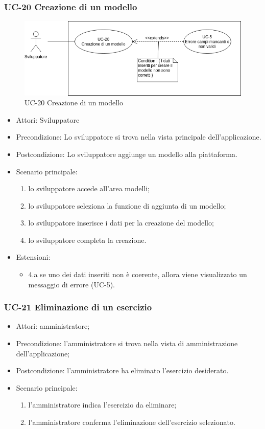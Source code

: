 	\subsubsection{UC-20 Creazione di un modello}
		\begin{figure}[h]
			\centering
			\includegraphics[scale=0.7]{images/UC-20.png}
				\caption{UC-20 Creazione di un modello}
		\end{figure}			
		\begin{itemize}
			\item Attori: Sviluppatore
			\item Precondizione: Lo sviluppatore si trova nella vista principale dell'applicazione.
			\item Postcondizione: Lo sviluppatore aggiunge un modello alla piattaforma.
			\item Scenario principale:
			\begin{enumerate}
				\item lo sviluppatore accede all'area modelli;
				\item lo sviluppatore seleziona la funzione di aggiunta di un modello;
				\item lo sviluppatore inserisce i dati per la creazione del modello;
				\item lo sviluppatore completa la creazione.
			\end{enumerate}
			\item Estensioni:
				\begin{itemize}
					\item 4.a se uno dei dati inseriti non è coerente, allora viene visualizzato un messaggio di errore (UC-5).
				\end{itemize}
		\end{itemize}
	\subsubsection{UC-21 Eliminazione di un esercizio}
			\begin{itemize}
			\item Attori: amministratore;
			\item Precondizione: l'amministratore si trova nella vista di amministrazione dell'applicazione;
			\item Postcondizione: l'amministratore ha eliminato l'esercizio desiderato.
			\item Scenario principale:
				\begin{enumerate}
					\item l'amministratore indica l'esercizio da eliminare;
					\item l'amministratore conferma l'eliminazione dell'esercizio selezionato.
				\end{enumerate}
		\end{itemize}